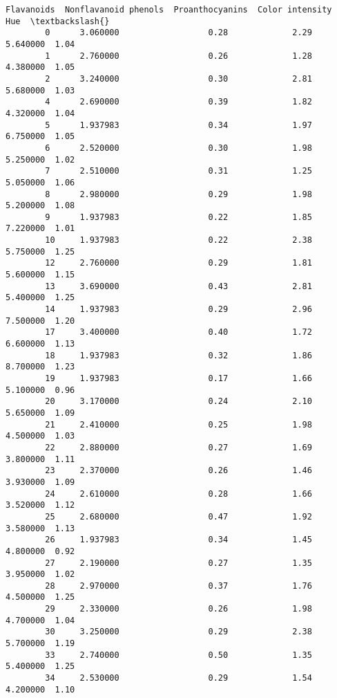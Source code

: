 \documentclass[11pt]{article}
\begin{document}
\begin{Verbatim}[commandchars=\\\{\}]
             Flavanoids  Nonflavanoid phenols  Proanthocyanins  Color intensity   Hue  \textbackslash{}
        0      3.060000                  0.28             2.29         5.640000  1.04   
        1      2.760000                  0.26             1.28         4.380000  1.05   
        2      3.240000                  0.30             2.81         5.680000  1.03   
        4      2.690000                  0.39             1.82         4.320000  1.04   
        5      1.937983                  0.34             1.97         6.750000  1.05   
        6      2.520000                  0.30             1.98         5.250000  1.02   
        7      2.510000                  0.31             1.25         5.050000  1.06   
        8      2.980000                  0.29             1.98         5.200000  1.08   
        9      1.937983                  0.22             1.85         7.220000  1.01   
        10     1.937983                  0.22             2.38         5.750000  1.25   
        12     2.760000                  0.29             1.81         5.600000  1.15   
        13     3.690000                  0.43             2.81         5.400000  1.25   
        14     1.937983                  0.29             2.96         7.500000  1.20   
        17     3.400000                  0.40             1.72         6.600000  1.13   
        18     1.937983                  0.32             1.86         8.700000  1.23   
        19     1.937983                  0.17             1.66         5.100000  0.96   
        20     3.170000                  0.24             2.10         5.650000  1.09   
        21     2.410000                  0.25             1.98         4.500000  1.03   
        22     2.880000                  0.27             1.69         3.800000  1.11   
        23     2.370000                  0.26             1.46         3.930000  1.09   
        24     2.610000                  0.28             1.66         3.520000  1.12   
        25     2.680000                  0.47             1.92         3.580000  1.13   
        26     1.937983                  0.34             1.45         4.800000  0.92   
        27     2.190000                  0.27             1.35         3.950000  1.02   
        28     2.970000                  0.37             1.76         4.500000  1.25   
        29     2.330000                  0.26             1.98         4.700000  1.04   
        30     3.250000                  0.29             2.38         5.700000  1.19   
        33     2.740000                  0.50             1.35         5.400000  1.25   
        34     2.530000                  0.29             1.54         4.200000  1.10   

\end{Verbatim}
\end{document}
